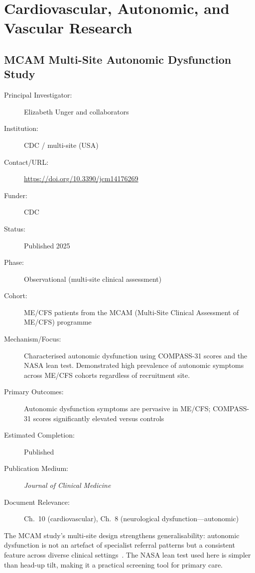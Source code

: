 \section{Cardiovascular, Autonomic, and Vascular Research}
\label{sec:registry-cardiovascular}

\subsection{MCAM Multi-Site Autonomic Dysfunction Study}
\label{sec:registry-mcam}

\begin{description}
    \item[Principal Investigator:] Elizabeth Unger and collaborators
    \item[Institution:] CDC / multi-site (USA)
    \item[Contact/URL:] \url{https://doi.org/10.3390/jcm14176269}
    \item[Funder:] CDC
    \item[Status:] Published 2025
    \item[Phase:] Observational (multi-site clinical assessment)
    \item[Cohort:] ME/CFS patients from the MCAM (Multi-Site Clinical
        Assessment of ME/CFS) programme
    \item[Mechanism/Focus:] Characterised autonomic dysfunction using
        COMPASS-31 scores and the NASA lean test.  Demonstrated high
        prevalence of autonomic symptoms across ME/CFS cohorts regardless
        of recruitment site.
    \item[Primary Outcomes:] Autonomic dysfunction symptoms are pervasive
        in ME/CFS; COMPASS-31 scores significantly elevated versus controls
    \item[Estimated Completion:] Published
    \item[Publication Medium:] \textit{Journal of Clinical Medicine}
    \item[Document Relevance:] Ch.~10 (cardiovascular), Ch.~8 (neurological
        dysfunction---autonomic)
\end{description}

The MCAM study's multi-site design strengthens generalisability: autonomic
dysfunction is not an artefact of specialist referral patterns but a
consistent feature across diverse clinical
settings~\cite{MCAM2025autonomic}.  The NASA lean test used here is simpler
than head-up tilt, making it a practical screening tool for primary care.


